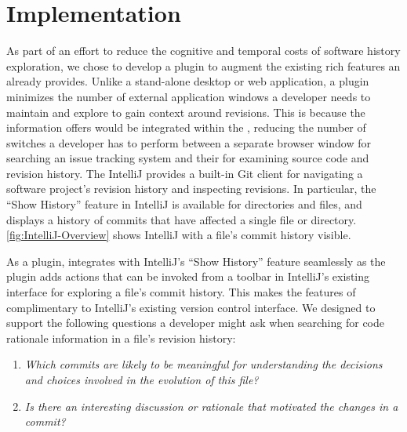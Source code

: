 
\section{Implementation}
\label{sec:Implementation}

As part of an effort to reduce the cognitive and temporal costs of software history exploration, we chose to develop a plugin to augment the existing rich features an  already provides.
Unlike a stand-alone desktop or web application, a plugin minimizes the number of external application windows a developer needs to maintain and explore to gain context around revisions. 
This is because the information  offers would be integrated within the , reducing the number of switches a developer has to perform between a separate browser window for searching an issue tracking system and their  for examining source code and revision history.
The IntelliJ  provides a built-in Git client  for navigating a software project's revision history and inspecting revisions. 
In particular, the ``Show History'' feature in IntelliJ is available for directories and files, and displays a history of commits that have affected a single file or directory.
\autoref{fig:IntelliJ-Overview} shows IntelliJ with a file's commit history visible.

As a plugin,  integrates with IntelliJ's ``Show History'' feature seamlessly as the plugin adds actions that can be invoked from a toolbar in IntelliJ's existing interface for exploring a file's commit history. 
This makes the features of  complimentary to IntelliJ's existing version control interface.
We designed  to support the following questions a developer might ask when searching for code rationale information in a file's revision history:

\begin{enumerate}[label={(\arabic*)}]
    \item \textit{Which commits are likely to be meaningful for understanding the decisions and choices involved in the evolution of this file?}
    \item \textit{Is there an interesting discussion or rationale that motivated the changes in a commit?}
\end{enumerate}

